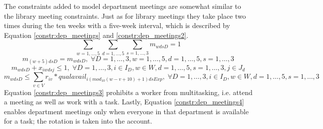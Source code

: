 The constraints added to model department meetings are somewhat similar to the library meeting constraints. Just as for library meetings they take place two times during the ten weeks with a five-week interval, which is described by Equation \ref{constr:dep_meetings} and \ref{constr:dep_meetings2}.
\begin{equation} \label{constr:dep_meetings}
\sum_{w = 1, \ldots, 5}\sum_{d = 1, \ldots, 5}\sum_{s = 1, \ldots, 3} m_{wdsD} = 1
\end{equation}
\begin{equation} \label{constr:dep_meetings2}
m_{(w+5)dsD} = m_{wdsD}, \; \forall D = 1, \ldots, 3, w = 1, \ldots, 5, d = 1, \ldots, 5, s = 1, \ldots, 3
\end{equation}
\begin{equation} \label{constr:dep_meetings3}
m_{wdsD} + x_{iwdsj} \leq 1, \; \forall D = 1, \ldots, 3, i \in I_D, w \in W, d = 1, \ldots, 5, s = 1, \ldots, 3, j \in J_d
\end{equation}
\begin{equation} \label{constr:dep_meetings4}
m_{wdsD} \leq \sum_{v \in V} r_{iv}*qualavail_{i(mod_{10}(w-v+10)+1)dsExp}, \; \forall D = 1, \ldots, 3, i \in I_D, w \in W, d = 1, \ldots, 5, s = 1, \ldots, 3
\end{equation}
Equation \ref{constr:dep_meetings3} prohibits a worker from multitasking, i.e. attend a meeting as well as work with a task. Lastly, Equation \ref{constr:dep_meetings4} enables department meetings only when everyone in that department is available for a task; the rotation is taken into the account.

